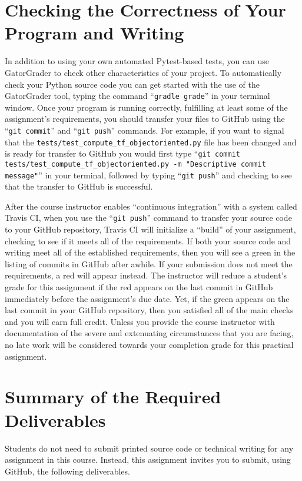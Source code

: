 \documentclass[11pt]{article}
\newcommand{\testprogramsource}{\lstinline{tests/test_compute_tf_objectoriented.py}}
\newcommand{\gatorgraderstart}{\command{gradle grade}}
\newcommand{\gitcommit}{\command{git commit}}
\newcommand{\gitpush}{\command{git push}}
\newcommand{\gitcommittestprogram}{\command{git commit tests/test_compute_tf_objectoriented.py -m "Descriptive commit message"}}
\newcommand{\command}[1]{``\lstinline{#1}''}
\newcommand{\step}[1]{``{#1}''}
\newcommand{\checkmark}{\ding{51}}
\newcommand{\naughtmark}{\ding{55}}
\begin{document}
\section*{Checking the Correctness of Your Program and Writing}

In addition to using your own automated Pytest-based tests, you can use
GatorGrader to check other characteristics of your project. To automatically
check your Python source code you can get started with the use of the
GatorGrader tool, typing the command \gatorgraderstart{} in your terminal
window.
%
Once your program is running correctly, fulfilling at least some of the
assignment's requirements, you should transfer your files to GitHub using the
\gitcommit{} and \gitpush{} commands. For example, if you want to signal that
the \testprogramsource{} file has been changed and is ready for transfer to
GitHub you would first type \gitcommittestprogram{} in your terminal, followed
by typing \gitpush{} and checking to see that the transfer to GitHub is
successful.

After the course instructor enables \step{continuous integration} with a system
called Travis CI, when you use the \gitpush{} command to transfer your source
code to your GitHub repository, Travis CI will initialize a \step{build} of your
assignment, checking to see if it meets all of the requirements. If both your
source code and writing meet all of the established requirements, then you will
see a green \checkmark{} in the listing of commits in GitHub after awhile. If
your submission does not meet the requirements, a red \naughtmark{} will appear
instead. The instructor will reduce a student's grade for this assignment if the
red \naughtmark{} appears on the last commit in GitHub immediately before the
assignment's due date. Yet, if the green \checkmark{} appears on the last commit
in your GitHub repository, then you satisfied all of the main checks and you
will earn full credit. Unless you provide the course instructor with
documentation of the severe and extenuating circumstances that you are facing,
no late work will be considered towards your completion grade for this practical
assignment.

\section*{Summary of the Required Deliverables}

\noindent Students do not need to submit printed source code or technical
writing for any assignment in this course. Instead, this assignment invites you
to submit, using GitHub, the following deliverables.
\end{document}
